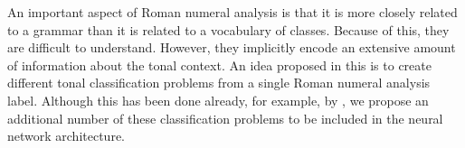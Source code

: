 

An important aspect of Roman numeral analysis is that it is
more closely related to a grammar than it is related to a
vocabulary of classes. Because of this, they are difficult
to understand. However, they implicitly encode an extensive
amount of information about the tonal context. An idea
proposed in this \thesisdiss{} is to create different tonal
classification problems from a single Roman numeral analysis
label. Although this has been done already, for example, by
\textcite{chen2018functional}, we propose an additional
number of these classification problems to be included in
the neural network architecture.
